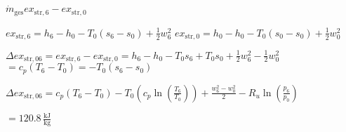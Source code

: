 \( \dot{m}_{\text{ges}} ex_{\text{str},6} - ex_{\text{str},0} \)  

\( ex_{\text{str},6} = h_6 - h_0 - T_0 (s_6 - s_0) + \frac{1}{2} w_6^2 \)  
\( ex_{\text{str},0} = h_0 - h_0 - T_0 (s_0 - s_0) + \frac{1}{2} w_0^2 \)  

\( \Delta ex_{\text{str},06} = ex_{\text{str},6} - ex_{\text{str},0} = h_6 - h_0 - T_0 s_6 + T_0 s_0 + \frac{1}{2} w_6^2 - \frac{1}{2} w_0^2 \)  
\( = c_p (T_6 - T_0) = -T_0 (s_6 - s_0) \)  

\( \Delta ex_{\text{str},06} = c_p (T_6 - T_0) - T_0 \left( c_p \ln \left( \frac{T_6}{T_0} \right) \right) + \frac{w_6^2 - w_0^2}{2} - R_u \ln \left( \frac{p_6}{p_0} \right) \)  

\( = 120.8 \, \frac{\text{kJ}}{\text{kg}} \)